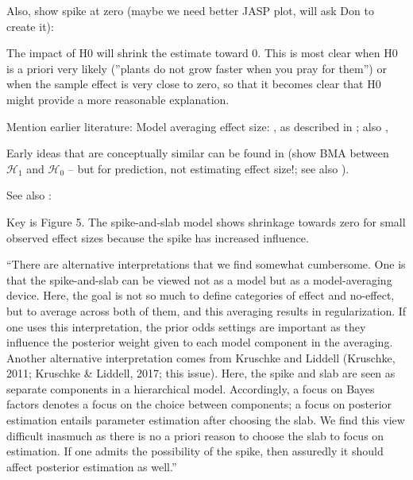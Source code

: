 \documentclass[a4paper,doc,natbib]{apa6}
\begin{document}
Also, show spike at zero (maybe we need better JASP plot, will ask Don to create it):

The impact of H0 will shrink the estimate toward 0. This is most clear when H0 is a priori very likely (''plants do not grow faster when
you pray for them'') or when the sample effect is very close to zero, so that it becomes clear that H0 might provide a more reasonable
explanation.

Mention earlier literature:
Model averaging effect size:
\citet[pp. 640-641]{ZellnerVandaele1975}, as described in \citet[p. 600-601]{ZellnerSiow1980}; also \citet[p. 57]{Haldane1932}, \citet{IversonEtAl2010}

Early ideas that are conceptually similar can be found in \citet[p. 387]{WrinchJeffreys1921} (show BMA between $\mathcal{H}_1$ and $\mathcal{H}_0$ -- but for prediction, not estimating effect size!; see also \citet{Jevons18741913}).

See also \citet{RouderEtAl2018PBR}:

Key is Figure 5. The spike-and-slab model shows shrinkage towards zero for small observed effect sizes because the spike has increased influence.

``There are alternative interpretations that we find somewhat cumbersome. One is that the spike-and-slab can be viewed not as a model but as a model-averaging device. Here, the goal is not so much to define categories of effect and no-effect, but to average across both of them, and this averaging results in regularization. If one uses this interpretation, the prior odds settings are important as they influence the posterior weight given to each model component in the averaging. Another alternative interpretation comes from Kruschke and Liddell (Kruschke, 2011; Kruschke \& Liddell, 2017; this issue). Here, the spike and slab are seen as separate components in a hierarchical model. Accordingly, a focus on Bayes factors denotes a focus on the choice between components; a focus on posterior estimation entails parameter estimation after choosing the slab. We find this view difficult inasmuch as there is no a priori reason to choose the slab to focus on estimation. If one admits the possibility of the spike, then assuredly it should affect posterior estimation as well.''

\newpage
\clearpage

\clearpage

\end{document}
